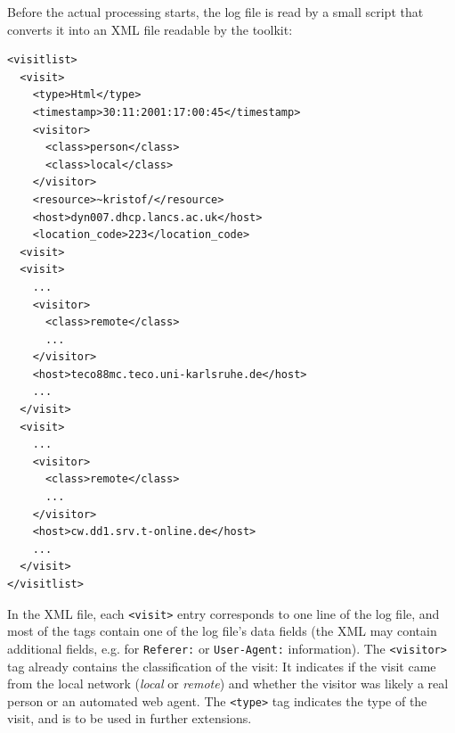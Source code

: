 \documentclass[a4paper]{danarticle}
\theoremstyle{remark}
\begin{document}
      Before the actual processing starts, the log file is read by a small
      script that converts it into an XML file readable by the toolkit:
      \begin{verbatim}
<visitlist>
  <visit>
    <type>Html</type>
    <timestamp>30:11:2001:17:00:45</timestamp>
    <visitor>
      <class>person</class>
      <class>local</class>
    </visitor>
    <resource>~kristof/</resource>
    <host>dyn007.dhcp.lancs.ac.uk</host>
    <location_code>223</location_code>
  <visit>
  <visit>
    ...
    <visitor>
      <class>remote</class>
      ...
    </visitor>
    <host>teco88mc.teco.uni-karlsruhe.de</host>
    ...
  </visit>
  <visit>
    ...
    <visitor>
      <class>remote</class>
      ...
    </visitor>
    <host>cw.dd1.srv.t-online.de</host>
    ...
  </visit>
</visitlist>
      \end{verbatim}
      In the XML file, each \verb$<visit>$ entry corresponds to one line of the
      log file, and most of the tags contain one of the log file's data fields
      (the XML may contain additional fields, e.g. for \verb$Referer:$ or 
      \verb$User-Agent:$ information). The \verb$<visitor>$ tag already
      contains the classification of the visit: It indicates if the visit came
      from the local network (\textit{local} or \textit{remote}) and whether the
      visitor was likely a real person or an automated web agent. The
      \verb$<type>$ tag indicates the type of the visit, and is to be used in
      further extensions.
\end{document}
